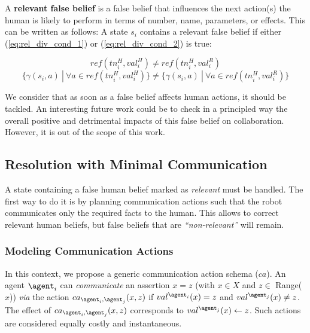 \begin{definition} \label{def:relevant_false_belief}

A \textbf{relevant false belief} is a false belief that influences the next action(s) the human is likely to perform in terms of number, name, parameters, or effects. This can be written as follows:
A state $s_i$ contains a relevant false belief if either (\ref{eq:rel_div_cond_1}) or (\ref{eq:rel_div_cond_2}) is true:

\begin{equation} \label{eq:rel_div_cond_1}
ref(tn^H_i, val^H_i) \neq ref(tn^H_i, val^R_i)
\end{equation}
\begin{equation} \label{eq:rel_div_cond_2}
\{ \gamma(s_i,a) ~|~ \forall a \in ref( tn^H_i, val^H_i ) \} \neq \{ \gamma(s_i,a) ~|~ \forall a \in ref( tn^H_i, val^R_i ) \}
\end{equation}
\end{definition}

We consider that as soon as a false belief affects human actions, it should be tackled. An interesting future work could be to check in a principled way the overall positive and detrimental impacts of this false belief on collaboration. However, it is out of the scope of this work.

    \subsection{Resolution with Minimal Communication}

A state containing a false human belief marked as \textit{relevant} must be handled. 
The first way to do it is by planning communication actions such that the robot communicates only the required facts to the human. This allows to correct relevant human beliefs, but false beliefs that are \textit{``non-relevant''} will remain. 

\subsubsection{Modeling Communication Actions} 
In this context, we propose a generic communication action schema ($ca$). 
An agent $\agent_i$ can \textit{communicate} an assertion $x=z$ (with $x \in X$ and $z \in$ Range($x$)) \textit{via} the action $ca_{\agent_i, \agent_j}(x,z)$ if $val^{\agent_i}(x) = z$ and $val^{\agent_j}(x) \neq z$.
The effect of $ca_{\agent_i, \agent_j}(x,z)$ corresponds to $val^{\agent_j}(x) \leftarrow z$. Such actions are considered equally costly and instantaneous.

